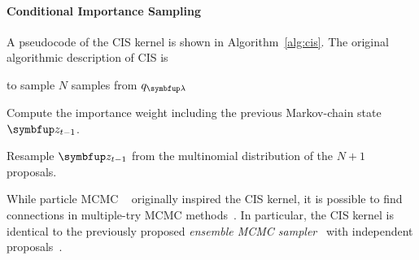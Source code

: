 \paragraph{Conditional Importance Sampling}
A pseudocode of the CIS kernel is shown in Algorithm~\ref{alg:cis}.
The original algorithmic description of CIS is
\begin{enumerate*}[label=(\arabic*)]
  \item to sample \(N\) samples from \(q_{\vlambda}\)
  \item Compute the importance weight including the previous Markov-chain state \(\vz_{t-1}\).
  \item Resample \(\vz_{t-1}\) from the multinomial distribution of the \(N+1\) proposals.
\end{enumerate*}
%
While particle MCMC ~ originally inspired the CIS kernel\citep{andrieu_particle_2010}, it is possible to find connections in multiple-try MCMC methods~\citep{martino_review_2018}.
In particular, the CIS kernel is identical to the previously proposed \textit{ensemble MCMC sampler}~\citep{neal_mcmc_2011a, austad_parallel_2007} with independent proposals~\citep[Table 12]{martino_review_2018}.

